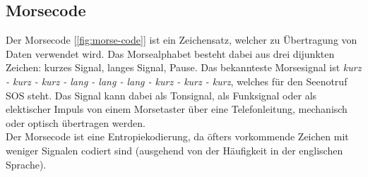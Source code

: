 \documentclass[a4paper,12pt]{article}
\begin{document}
	\subsection{Morsecode}
	Der Morsecode [\ref{fig:morse-code}] ist ein Zeichensatz, welcher zu Übertragung von Daten verwendet wird. Das Morsealphabet besteht dabei aus drei dijunkten Zeichen: kurzes Signal, langes Signal, Pause. Das bekannteste Morsesignal ist \textit{kurz - kurz - kurz - lang - lang - lang - kurz - kurz - kurz}, welches für den Seenotruf SOS steht. Das Signal kann dabei als Tonsignal, als Funksignal oder als elektischer Impuls von einem Morsetaster über eine Telefonleitung, mechanisch oder optisch übertragen werden.\\
	Der Morsecode ist eine Entropiekodierung, da öfters vorkommende Zeichen mit weniger Signalen codiert sind (ausgehend von der Häufigkeit in der englischen Sprache).\\
\end{document}
